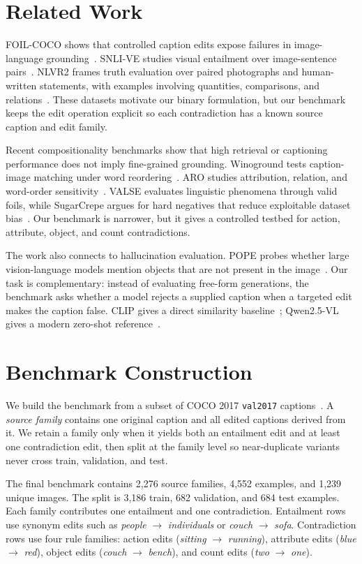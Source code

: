 \documentclass[10pt,twocolumn,letterpaper]{article}
\begin{document}
\section{Related Work}
\noindent
FOIL-COCO shows that controlled caption edits expose failures in image-language grounding~\cite{shekhar2017foil}. SNLI-VE studies visual entailment over image-sentence pairs~\cite{xie2019visual}. NLVR2 frames truth evaluation over paired photographs and human-written statements, with examples involving quantities, comparisons, and relations~\cite{suhr2019nlvr2}. These datasets motivate our binary formulation, but our benchmark keeps the edit operation explicit so each contradiction has a known source caption and edit family.

Recent compositionality benchmarks show that high retrieval or captioning performance does not imply fine-grained grounding. Winoground tests caption-image matching under word reordering~\cite{thrush2022winoground}. ARO studies attribution, relation, and word-order sensitivity~\cite{yuksekgonul2023bags}. VALSE evaluates linguistic phenomena through valid foils, while SugarCrepe argues for hard negatives that reduce exploitable dataset bias~\cite{parcalabescu2022valse,hsieh2023sugarcrepe}. Our benchmark is narrower, but it gives a controlled testbed for action, attribute, object, and count contradictions.

The work also connects to hallucination evaluation. POPE probes whether large vision-language models mention objects that are not present in the image~\cite{li2023pope}. Our task is complementary: instead of evaluating free-form generations, the benchmark asks whether a model rejects a supplied caption when a targeted edit makes the caption false. CLIP gives a direct similarity baseline~\cite{radford2021learning}; Qwen2.5-VL gives a modern zero-shot reference~\cite{bai2025qwen}.

\section{Benchmark Construction}
\noindent
We build the benchmark from a subset of COCO 2017 \texttt{val2017} captions~\cite{lin2014microsoft}. A \textit{source family} contains one original caption and all edited captions derived from it. We retain a family only when it yields both an entailment edit and at least one contradiction edit, then split at the family level so near-duplicate variants never cross train, validation, and test.

The final benchmark contains 2,276 source families, 4,552 examples, and 1,239 unique images. The split is 3,186 train, 682 validation, and 684 test examples. Each family contributes one entailment and one contradiction. Entailment rows use synonym edits such as \textit{people} $\rightarrow$ \textit{individuals} or \textit{couch} $\rightarrow$ \textit{sofa}. Contradiction rows use four rule families: action edits (\textit{sitting} $\rightarrow$ \textit{running}), attribute edits (\textit{blue} $\rightarrow$ \textit{red}), object edits (\textit{couch} $\rightarrow$ \textit{bench}), and count edits (\textit{two} $\rightarrow$ \textit{one}).
\end{document}
